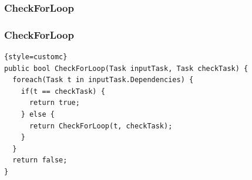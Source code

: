 \newpage

\subsubsection{CheckForLoop}
\begin{frame}[fragile]
\frametitle{CheckForLoop}
\fontsize{8pt}{7}\selectfont
\begin{lstlisting}{style=customc}
public bool CheckForLoop(Task inputTask, Task checkTask) {
  foreach(Task t in inputTask.Dependencies) {
    if(t == checkTask) {
      return true;
    } else {
      return CheckForLoop(t, checkTask);
    }
  }
  return false;
}
\end{lstlisting}
\end{frame}